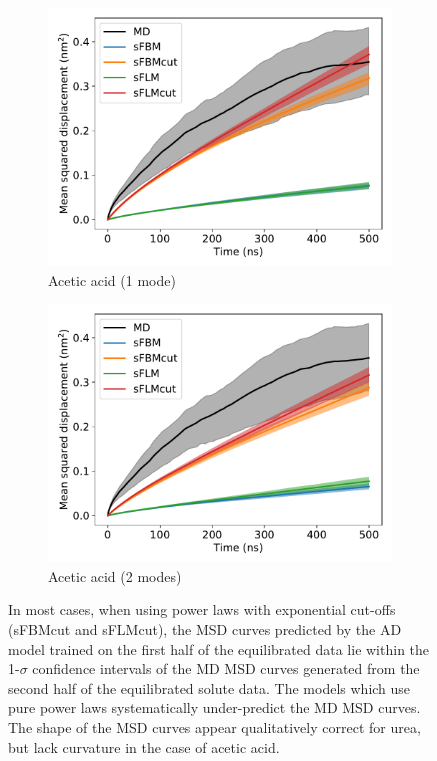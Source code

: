 \documentclass{article}
\begin{document}
\begin{figure}
\begin{subfigure}{0.45\textwidth}
  \includegraphics[width=\textwidth]{1mode_msd_comparison_ACH_train_front.pdf}
  \caption{Acetic acid (1 mode)}\label{fig:1mode_msd_comparison_ACH_train_front}
  \end{subfigure}
  \begin{subfigure}{0.45\textwidth}
  \includegraphics[width=\textwidth]{2mode_msd_comparison_ACH_train_front.pdf}
  \caption{Acetic acid (2 modes)}\label{fig:2mode_msd_comparison_ACH_train_front}
  \end{subfigure} 
  \caption{In most cases, when using power laws with exponential cut-offs 
  (sFBMcut and sFLMcut), the MSD curves predicted by the AD model trained on 
  the first half of the equilibrated data lie within the 1-$\sigma$ confidence
  intervals of the MD MSD curves generated from the second half of the equilibrated
  solute data. The models which use pure power laws systematically under-predict
  the MD MSD curves. The shape of the MSD curves appear qualitatively correct
  for urea, but lack curvature in the case of acetic acid.}\label{fig:train_test}
  \end{figure}
  
\end{document}
